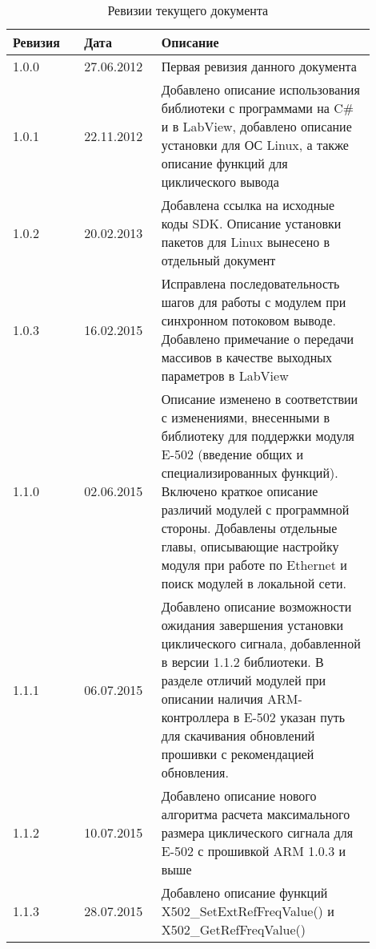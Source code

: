 \documentclass[12pt,a4paper,titlepage]{report}
\begin{document}
  \begin{longtable}{|m{0.18\linewidth}|m{0.18\linewidth}|m{0.54\linewidth}|}
  \caption{Ревизии текущего документа}\\\hline
  \textbf{Ревизия} & \textbf{Дата} & \textbf{Описание}\\\hline
  1.0.0            & 27.06.2012    & Первая ревизия данного документа \\\hline
  1.0.1            & 22.11.2012    & Добавлено описание использования библиотеки с программами на C\# и в LabView, добавлено описание установки для ОС Linux, а также описание функций для циклического вывода \\\hline
  1.0.2            & 20.02.2013    & Добавлена ссылка на исходные коды SDK. Описание установки пакетов для Linux вынесено в отдельный документ \\\hline
  1.0.3            & 16.02.2015    & Исправлена последовательность шагов для работы с модулем при синхронном потоковом выводе. Добавлено примечание о передачи массивов в качестве выходных параметров в LabView \\\hline
  1.1.0            & 02.06.2015    & Описание изменено в соответствии с изменениями, внесенными в библиотеку для поддержки модуля E-502 (введение общих и специализированных функций). Включено краткое описание различий модулей с программной стороны. Добавлены отдельные главы, описывающие настройку модуля при работе по Ethernet и поиск модулей в локальной сети. \\\hline
  1.1.1            & 06.07.2015    & Добавлено описание возможности ожидания завершения установки циклического сигнала, добавленной в версии 1.1.2 библиотеки. В разделе отличий модулей при описании наличия ARM-контроллера в E-502 указан путь для скачивания обновлений прошивки с рекомендацией обновления. \\\hline
  1.1.2            & 10.07.2015    & Добавлено описание нового алгоритма расчета максимального размера циклического сигнала для E-502 с прошивкой ARM 1.0.3 и выше \\\hline
  1.1.3            & 28.07.2015    & Добавлено описание функций X502\_SetExtRefFreqValue() и X502\_GetRefFreqValue() \\\hline

\end{longtable}
\end{document}
